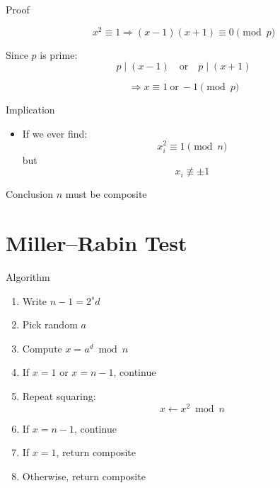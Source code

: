 \documentclass{beamer}
\begin{document}

\begin{frame}{Proof}

\[
x^2 \equiv 1 \Rightarrow (x-1)(x+1) \equiv 0 \pmod{p}
\]

\vspace{1em}

Since $p$ is prime:
\[
p \mid (x-1) \quad \text{or} \quad p \mid (x+1)
\]

\vspace{1em}

\[
\Rightarrow x \equiv 1 \ \text{or} \ -1 \pmod{p}
\]

\end{frame}


\begin{frame}{Implication}

\begin{itemize}
    \item If we ever find:
    \[
    x_i^2 \equiv 1 \pmod{n}
    \]
    but
    \[
    x_i \not\equiv \pm 1
    \]
\end{itemize}

\vspace{1em}

\begin{block}{Conclusion}
$n$ must be composite
\end{block}

\end{frame}

\section{Miller--Rabin Test}

\begin{frame}{Algorithm}

\begin{enumerate}
    \item Write $n-1 = 2^s d$
    \item Pick random $a$
    \item Compute $x = a^d \bmod n$
    \item If $x=1$ or $x=n-1$, continue
    \item Repeat squaring:
    \[
    x \leftarrow x^2 \bmod n
    \]
    \item If $x = n-1$, continue
    \item If $x = 1$, return composite
    \item Otherwise, return composite
\end{enumerate}

\end{frame}
\end{document}
